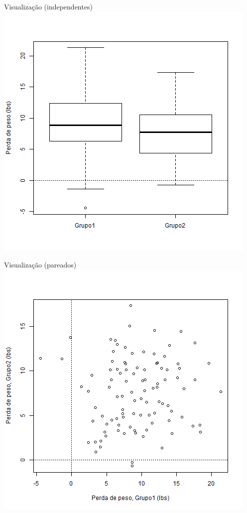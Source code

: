 \documentclass{beamer}
\begin{document}
\begin{frame}{Visualização (independentes)}
  \includegraphics[height=\textheight]{Cap23-25/2-amostras-independentes}
\end{frame}

\begin{frame}{Visualização (pareados)}
    \includegraphics[height=\textheight]{Cap23-25/2-amostras-pareadas}
  \end{frame}
\end{document}
